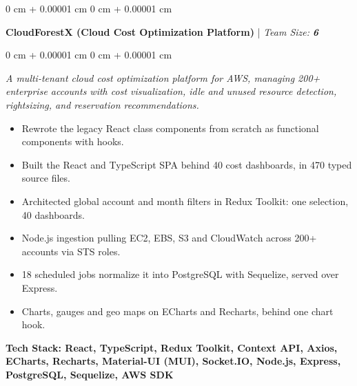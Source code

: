 \documentclass[10pt, letterpaper]{article}
\newenvironment{highlights}{
    \begin{itemize}[
        topsep=0.12 cm,
        leftsep=0.20cm,
        parsep=0.12 cm,
        partopsep=0pt,
        parindent=4pt,
        itemsep=4pt,
        leftmargin=0 cm + 20pt
    ]
}{
    \end{itemize}
}
\newenvironment{onecolentry}{
    \begin{adjustwidth}{
        0 cm + 0.00001 cm
    }{
        0 cm + 0.00001 cm
    }
}{
    \end{adjustwidth}
}
\begin{document}
    \begin{onecolentry}
        \textbf{CloudForestX (Cloud Cost Optimization Platform)} | \textit{Team Size:} \textbf{\textit{6}}
    \end{onecolentry}
    \vspace{0.10 cm}
    \begin{onecolentry}
        \textit{A multi-tenant cloud cost optimization platform for AWS, managing 200+ enterprise accounts with cost visualization, idle and unused resource detection, rightsizing, and reservation recommendations.}
        \begin{highlights}
            \item Rewrote the legacy React class components from scratch as functional components with hooks.
            \item Built the React and TypeScript SPA behind 40 cost dashboards, in 470 typed source files.
            \item Architected global account and month filters in Redux Toolkit: one selection, 40 dashboards.
            \item Node.js ingestion pulling EC2, EBS, S3 and CloudWatch across 200+ accounts via STS roles.
            \item 18 scheduled jobs normalize it into PostgreSQL with Sequelize, served over Express.
            \item Charts, gauges and geo maps on ECharts and Recharts, behind one chart hook.
        \end{highlights}
        \vspace{0.10 cm}
        \textbf{Tech Stack: React, TypeScript, Redux Toolkit, Context API, Axios, ECharts, Recharts, Material-UI (MUI), Socket.IO, Node.js, Express, PostgreSQL, Sequelize, AWS SDK}
    \end{onecolentry}

    \vspace{0.34 cm}
\end{document}
